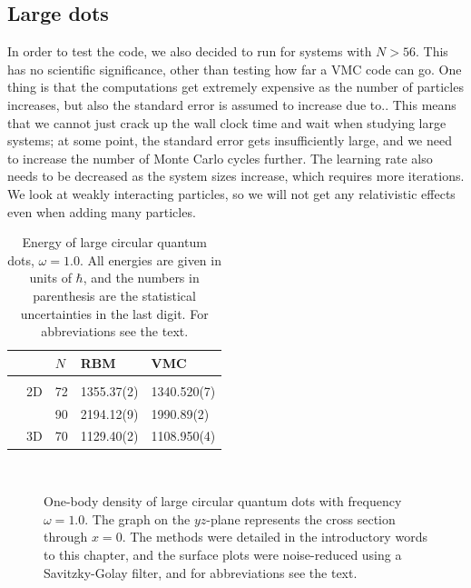 \subsection{Large dots}
In order to test the code, we also decided to run for systems with $N>56$. This has no scientific significance, other than testing how far a VMC code can go. One thing is that the computations get extremely expensive as the number of particles increases, but also the standard error is assumed to increase due to.. This means that we cannot just crack up the wall clock time and wait when studying large systems; at some point, the standard error gets insufficiently large, and we need to increase the number of Monte Carlo cycles further. The learning rate also needs to be decreased as the system sizes increase, which requires more iterations.  We look at weakly interacting particles, so we will not get any relativistic effects even when adding many particles.

\begin{table}[H]
	\caption{Energy of large circular quantum dots, $\omega=1.0$. All energies are given in units of $\hbar$, and the numbers in parenthesis are the statistical uncertainties in the last digit. For abbreviations see the text.}
	\label{tab:largeQD}
	\begin{tabularx}{\textwidth}{R{1.6cm}R{2cm}R{2cm}R{3cm}R{3cm}} \hline\hline
		& \makecell{\\ \phantom{$N$}} & $N$ & RBM & VMC \\ \hline \\
		& 2D & 72 & 1355.37(2) & 1340.520(7) \\
		&& 90 & 2194.12(9) & 1990.89(2) \\
		& 3D & 70 & 1129.40(2) & 1108.950(4) \\
		\hline \hline
	\end{tabularx}
\end{table}

\begin{figure}[H]
	\centering
	\captionsetup[subfigure]{labelformat=empty}
	\\
	\caption{One-body density of large circular quantum dots with frequency $\omega=1.0$. The graph on the $yz$-plane represents the cross section through $x=0$. The methods were detailed in the introductory words to this chapter, and the surface plots were noise-reduced using a Savitzky-Golay filter, and for abbreviations see the text.}
	\label{fig:largedotsOB}
\end{figure}

